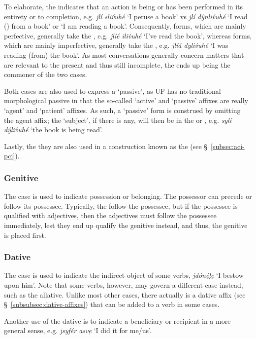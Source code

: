 \documentclass[a4paper, 12pt, twoside, final]{article}
\let \w \textit
\begin{document}
To elaborate, the  indicates that an action is being or has been performed in its entirety or to completion, e.g.
\w{jlí sliv́uhé} ‘I peruse a book’ vs \w{jlí dŷnliv́uhé} ‘I read () from a book’ or ‘I am reading a book’. Consequently,
 forms, which are mainly perfective, generally take the , e.g. \w{jlíé iliv́uhé} ‘I’ve read the book’,
whereas  forms, which are mainly imperfective, generally take the , e.g. \w{jlíá dyliv́uhé} ‘I was reading
(from) the book’. As most conversations generally concern matters that are relevant to the present and thus still incomplete,
the  ends up being the commoner of the two cases.

Both cases are also used to express a ‘passive’, as UF has no traditional morphological passive in that the so-called
‘active’ and ‘passive’ affixes are really ‘agent’ and ‘patient’ affixes. As such, a ‘passive’ form is construed by
omitting the agent affix; the ‘subject’, if there is any, will then be in the  or , e.g. \w{sylí dýliv́uhé}
‘the book is being read’.

Lastly, the they are also used in a construction known as the  (see §~\ref{subsec:aci-pci}).

\subsubsection{Genitive}
The  case is used to indicate possession or belonging. The possessor can precede or follow its possessee. Typically,
the  follow the possessee, but if the possessee is qualified with adjectives, then the adjectives must follow the
possessee immediately, lest they end up qualify the genitive instead, and thus, the genitive is placed first.

\subsubsection{Dative}
The  case is used to indicate the indirect object of some verbs, \w{jdónẹ́ḷẹ} ‘I bestow upon him’. Note that some
verbs, however, may govern a different case instead, such as the allative. Unlike most other cases, there actually is
a dative affix (see §~\ref{subsubsec:dative-affixes}) that can be added to a verb in some cases.

Another use of the dative is to indicate a beneficiary or recipient in a more general sense, e.g. \w{jsyfér asvẹ} ‘I did
it for me/us’.
\end{document}

